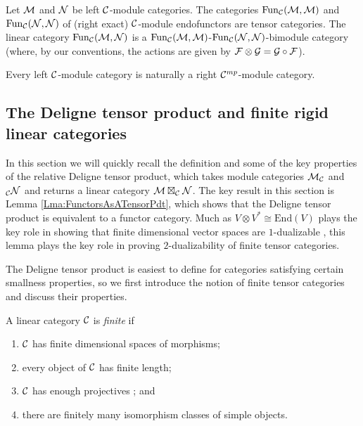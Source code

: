 \documentclass{amsart}
\begin{document}
\begin{example}
	Let $\mathcal M$ and $\mathcal N$ be left $\mathcal C$-module categories. The categories $\operatorname{Fun}_{\mathcal C}(\mathcal M, \mathcal M)$ and $\operatorname{Fun}_{\mathcal C}(\mathcal N, \mathcal N)$ of (right exact) $\mathcal C$-module endofunctors are tensor categories. The linear category $\operatorname{Fun}_{\mathcal C}(\mathcal M, \mathcal N)$ is a $\operatorname{Fun}_{\mathcal C}(\mathcal M, \mathcal M)$-$\operatorname{Fun}_{\mathcal C}(\mathcal N, \mathcal N)$-bimodule category (where, by our conventions, the actions are given by $\mathcal F \otimes \mathcal G = \mathcal G \circ \mathcal F$). 
\end{example}

\begin{remark}
 	Every left $\mathcal C$-module category is naturally a right $\mathcal C^{mp}$-module category. 
\end{remark}


\subsection{The Deligne tensor product and finite rigid linear categories} \label{sec-tc-deligne}

In this section we will quickly recall the definition and some of the key properties of the relative Deligne tensor product, which takes module categories $\mathcal M_\mathcal C$ and ${}_\mathcal C \mathcal N$ and returns a linear category $\mathcal M \boxtimes_\mathcal C \mathcal N$.  The key result in this section is Lemma \ref{Lma:FunctorsAsATensorPdt}, which shows that the Deligne tensor product is equivalent to a functor category.  Much as $V \otimes V^* \cong \mathrm{End}(V)$ plays the key role in showing that finite dimensional vector spaces are $1$-dualizable \cite{???}, this lemma plays the key role in proving $2$-dualizability of finite tensor categories.

The Deligne tensor product is easiest to define for categories satisfying certain smallness properties, so we first introduce the notion of finite tensor categories and discuss their properties.

\begin{definition} %
	A linear category $\mathcal C$ is {\em finite} if 
	\begin{enumerate}
		\item $\mathcal C$ has finite dimensional spaces of morphisms;
		\item every object of $\mathcal C$ has finite length;
		\item $\mathcal C$ has enough projectives%
		; and
		\item there are finitely many isomorphism classes of simple objects.  
	\end{enumerate}
\end{definition}
\end{document}

